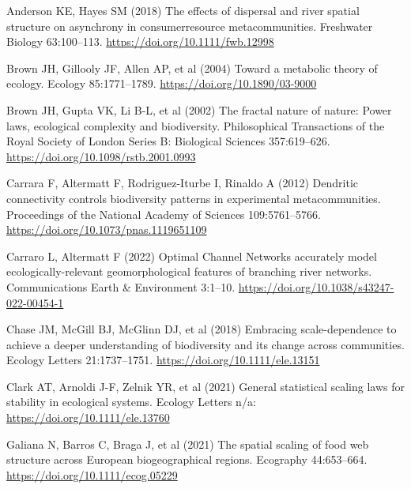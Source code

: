 \documentclass[
  12pt,
]{article}
\newlength{\cslhangindent}
\newlength{\cslentryspacingunit} %
\newenvironment{CSLReferences}[2] %
 {%
  \setlength{\parindent}{0pt}
  \ifodd #1
  \let\oldpar\par
  \def\par{\hangindent=\cslhangindent\oldpar}
  \fi
  \setlength{\parskip}{#2\cslentryspacingunit}
 }%
 {}
\begin{document}
\hypertarget{refs}{}
\begin{CSLReferences}{1}{0}
\leavevmode{}%
Anderson KE, Hayes SM (2018) The effects of dispersal and river spatial structure on asynchrony in consumer\textendash resource metacommunities. Freshwater Biology 63:100--113. \url{https://doi.org/10.1111/fwb.12998}

\leavevmode{}%
Brown JH, Gillooly JF, Allen AP, et al (2004) Toward a metabolic theory of ecology. Ecology 85:1771--1789. \url{https://doi.org/10.1890/03-9000}

\leavevmode{}%
Brown JH, Gupta VK, Li B-L, et al (2002) The fractal nature of nature: Power laws, ecological complexity and biodiversity. Philosophical Transactions of the Royal Society of London Series B: Biological Sciences 357:619--626. \url{https://doi.org/10.1098/rstb.2001.0993}

\leavevmode{}%
Carrara F, Altermatt F, Rodriguez-Iturbe I, Rinaldo A (2012) Dendritic connectivity controls biodiversity patterns in experimental metacommunities. Proceedings of the National Academy of Sciences 109:5761--5766. \url{https://doi.org/10.1073/pnas.1119651109}

\leavevmode{}%
Carraro L, Altermatt F (2022) Optimal {Channel Networks} accurately model ecologically-relevant geomorphological features of branching river networks. Communications Earth \& Environment 3:1--10. \url{https://doi.org/10.1038/s43247-022-00454-1}

\leavevmode{}%
Chase JM, McGill BJ, McGlinn DJ, et al (2018) Embracing scale-dependence to achieve a deeper understanding of biodiversity and its change across communities. Ecology Letters 21:1737--1751. \url{https://doi.org/10.1111/ele.13151}

\leavevmode{}%
Clark AT, Arnoldi J-F, Zelnik YR, et al (2021) General statistical scaling laws for stability in ecological systems. Ecology Letters n/a: \url{https://doi.org/10.1111/ele.13760}

\leavevmode{}%
Galiana N, Barros C, Braga J, et al (2021) The spatial scaling of food web structure across {European} biogeographical regions. Ecography 44:653--664. \url{https://doi.org/10.1111/ecog.05229}


\end{CSLReferences}
\end{document}
